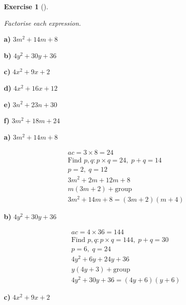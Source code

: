 \documentclass[
  letterpaper,
  DIV=11,
  numbers=noendperiod]{scrreprt}
\theoremstyle{definition}
\newtheorem{exercise}{Exercise}[chapter]
\theoremstyle{remark}
\begin{document}
\begin{exercise}[]\protect\hypertarget{exr-u6-4}{}\label{exr-u6-4}

\emph{Factorise each expression.}

\textbf{a)} \(\displaystyle 3m^2 + 14m + 8\)

\textbf{b)} \(\displaystyle 4y^2 + 30y + 36\)

\textbf{c)} \(\displaystyle 4x^2 + 9x + 2\)

\textbf{d)} \(\displaystyle 4x^2 + 16x + 12\)

\textbf{e)} \(\displaystyle 3n^2 + 23n + 30\)

\textbf{f)} \(\displaystyle 3m^2 + 18m + 24\)

\begin{tcolorbox}[enhanced jigsaw, opacitybacktitle=0.6, coltitle=black, arc=.35mm, colframe=quarto-callout-tip-color-frame, colback=white, bottomrule=.15mm, left=2mm, colbacktitle=quarto-callout-tip-color!10!white, titlerule=0mm, opacityback=0, title=\textcolor{quarto-callout-tip-color}{\faLightbulb}\hspace{0.5em}{🔍 View Solutions}, leftrule=.75mm, breakable, rightrule=.15mm, bottomtitle=1mm, toptitle=1mm, toprule=.15mm]

\textbf{a)} \(\displaystyle 3m^2 + 14m + 8\)

\begin{align*}
ac = 3 \times 8 = 24 \\ \text{Find } p, q: p \times q = 24,\; p + q = 14 \\ p = 2,\; q = 12 \\ 3m^2 + 2m + 12m + 8 \\ m(3m + 2) + \text{group} \\ 3m^2 + 14m + 8 = (3m + 2)(m + 4)
\end{align*}

\textbf{b)} \(\displaystyle 4y^2 + 30y + 36\)

\begin{align*}
ac = 4 \times 36 = 144 \\ \text{Find } p, q: p \times q = 144,\; p + q = 30 \\ p = 6,\; q = 24 \\ 4y^2 + 6y + 24y + 36 \\ y(4y + 3) + \text{group} \\ 4y^2 + 30y + 36 = (4y + 6)(y + 6)
\end{align*}

\textbf{c)} \(\displaystyle 4x^2 + 9x + 2\)


\end{tcolorbox}
\end{exercise}
\end{document}
